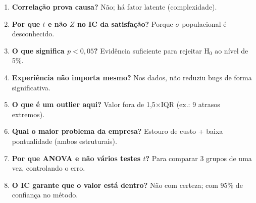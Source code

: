 \documentclass[a4paper, 11pt]{article}
\begin{document}
\begin{enumerate}[leftmargin=*]
	\item \textbf{Correlação prova causa?} Não; há fator latente (complexidade).
	\item \textbf{Por que $t$ e não $Z$ no IC da satisfação?} Porque $\sigma$ populacional é desconhecido.
	\item \textbf{O que significa $p<0{,}05$?} Evidência suficiente para rejeitar H$_0$ ao nível de 5\%.
	\item \textbf{Experiência não importa mesmo?} Nos dados, não reduziu bugs de forma significativa.
	\item \textbf{O que é um outlier aqui?} Valor fora de 1,5$\times$IQR (ex.: 9 atrasos extremos).
	\item \textbf{Qual o maior problema da empresa?} Estouro de custo + baixa pontualidade (ambos estruturais).
	\item \textbf{Por que ANOVA e não vários testes $t$?} Para comparar 3 grupos de uma vez, controlando o erro.
	\item \textbf{O IC garante que o valor está dentro?} Não com certeza; com 95\% de confiança no método.
\end{enumerate}
\end{document}
